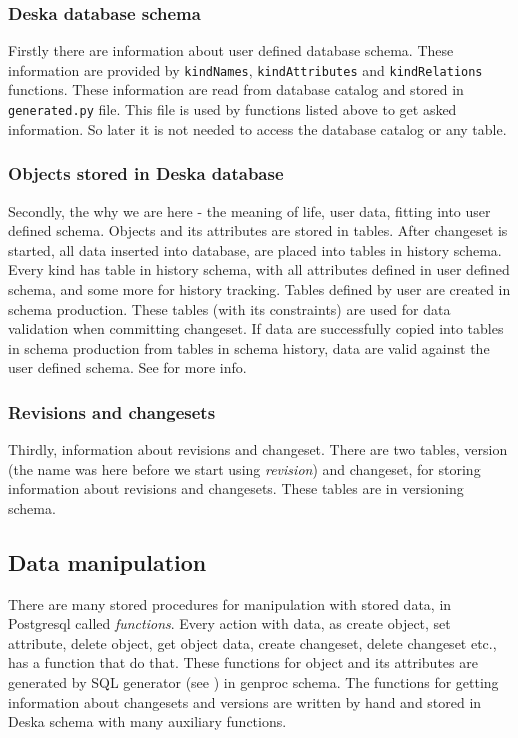 \documentclass[deska]{subfiles}
\begin{document}
\subsubsection{Deska database schema} 
Firstly there are information about user defined database schema. These information are provided by {\tt kindNames}, {\tt kindAttributes} and {\tt kindRelations} functions.
These information are read from database catalog and stored in {\tt generated.py} file. This file is used by functions listed above to get asked information. So later it is not needed to access the database catalog or any table.

\subsubsection{Objects stored in Deska database}
Secondly, the why we are here - the meaning of life, user data, fitting into user defined schema.
Objects and its attributes are stored in tables. 
After changeset is started, all data inserted into database, are placed into tables in history schema. Every kind has table in history
schema, with all attributes defined in user defined schema, and some more for history tracking.
Tables defined by user are created in schema production. These tables
(with its constraints) are used for data validation when committing changeset. If data are successfully copied into tables in schema production
from tables in schema history, data are valid against the user defined schema.
See  for more info.

\subsubsection{Revisions and changesets}
Thirdly, information about revisions and changeset. There are two tables, version (the name was here before
we start using {\em revision}) and changeset, for storing information about revisions and changesets. These tables are
in versioning schema.

\subsection{Data manipulation}
There are many stored procedures for manipulation with stored data, in Postgresql called {\em functions}.
Every action with data, as create object, set attribute, delete object, get object data, create changeset, delete changeset etc.,
has a function that do that. These functions for object and its attributes are generated by SQL generator (see ) in genproc schema.
The functions for getting information about changesets and versions are written by hand and stored in Deska schema with many auxiliary functions.
\end{document}
